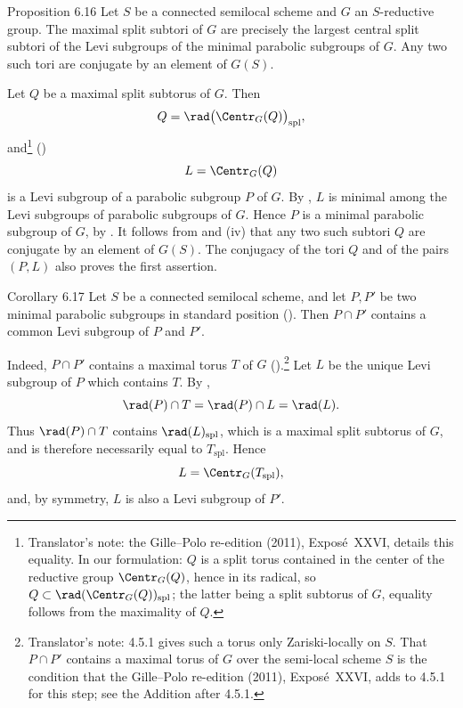 \begin{sgastatement}{Proposition 6.16}
Let \(S\) be a connected semilocal scheme and \(G\) an
\(S\)-reductive group.  The maximal split subtori of \(G\) are
precisely the largest central split subtori of the Levi subgroups of
the minimal parabolic subgroups of \(G\).  Any two such tori are
conjugate by an element of \(G(S)\).
\end{sgastatement}

Let \(Q\) be a maximal split subtorus of \(G\).  Then
\[
 Q=\rad\bigl(\Centr_G(Q)\bigr)_{\mathrm{spl}},
\]
and\footnote{Translator's note: the Gille--Polo re-edition (2011), Exposé~XXVI, details
this equality. In our formulation: \(Q\) is a split torus contained in the
center of the reductive group \(\Centr_G(Q)\), hence in its radical, so
\(Q\subset\rad(\Centr_G(Q))_{\mathrm{spl}}\); the latter being a split subtorus
of \(G\), equality follows from the maximality of \(Q\).} \textup{()}
\[
 L=\Centr_G(Q)
\]
is a Levi subgroup of a parabolic subgroup \(P\) of \(G\).
By , \(L\) is minimal among the Levi subgroups of parabolic
subgroups of \(G\).  Hence \(P\) is a minimal parabolic subgroup of
\(G\), by .  It follows from  and \textup{(iv)} that any
two such subtori \(Q\) are conjugate by an element of \(G(S)\).
The conjugacy of the tori \(Q\) and of the pairs \((P,L)\) also
proves the first assertion.

\begin{sgastatement}{Corollary 6.17}
Let \(S\) be a connected semilocal scheme, and let \(P,P'\) be two
minimal parabolic subgroups in standard position
\textup{()}.  Then \(P\cap P'\) contains a common Levi
subgroup of \(P\) and \(P'\).
\end{sgastatement}

Indeed, \(P\cap P'\) contains a maximal torus \(T\) of \(G\)
\textup{()}.\footnote{Translator's note: 4.5.1 gives such a torus only Zariski-locally on
\(S\). That \(P\cap P'\) contains a maximal torus of \(G\) over the
semi-local scheme \(S\) is the condition that the Gille--Polo re-edition
(2011), Exposé~XXVI, adds to 4.5.1 for this step; see the Addition after
4.5.1.}  Let \(L\) be the unique Levi subgroup of \(P\)
which contains \(T\).  By ,
\[
 \rad(P)\cap T=\rad(P)\cap L=\rad(L).
\]
Thus \(\rad(P)\cap T\) contains
\(\rad(L)_{\mathrm{spl}}\), which is a maximal split subtorus of
\(G\), and is therefore necessarily equal to
\(T_{\mathrm{spl}}\).  Hence
\[
 L=\Centr_G(T_{\mathrm{spl}}),
\]
and, by symmetry, \(L\) is also a Levi subgroup of \(P'\).

